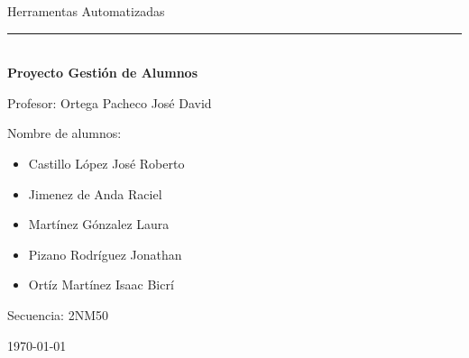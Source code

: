 \begin{titlepage}
    	\vspace{1cm} %

    	\LARGE {Herramentas Automatizadas\\}
    	\rule{7cm}{3pt} %
    	\vspace{0.5cm} %
    	\LARGE \textbf{\\Proyecto Gestión de Alumnos}

    	\vspace{1cm} %

    	\LARGE {Profesor: Ortega Pacheco José David}

    	\vspace{0.2cm} %

   	Nombre de alumnos:
   	\begin{itemize}
   		\item Castillo López José Roberto
   		\item Jimenez de Anda Raciel
   		\item Martínez Gónzalez Laura
   		\item Pizano Rodríguez Jonathan
   		\item Ortíz Martínez Isaac Bicrí
   	\end{itemize}
    	Secuencia: 2NM50

    	\vspace{0.2cm} %

		\today

\end{titlepage}